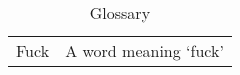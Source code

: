 \documentclass[Orator.tex]{subfiles}
\begin{document}
\begin{table}[htbp]
    \centering
    \caption{Glossary}\label{tab:gloss}
    \begin{tabular}{ c l }
        Fuck & A word meaning `fuck'
    \end{tabular}
\end{table}
\end{document}
